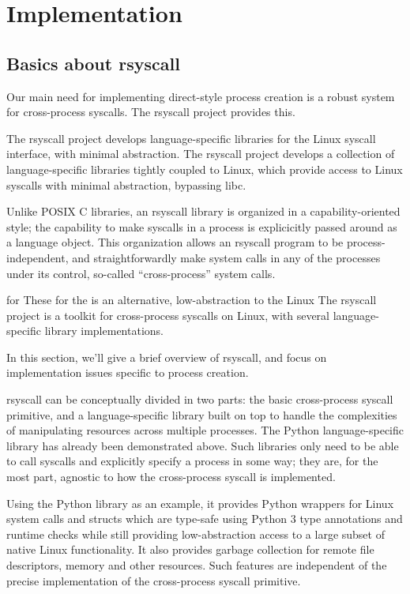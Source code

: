 \documentclass{acmart}
\begin{document}
\section{Implementation}\label{implementation}
\subsection{Basics about rsyscall}
Our main need for implementing direct-style process creation
is a robust system for cross-process syscalls.
The rsyscall project provides this.

The rsyscall project develops language-specific libraries
for the Linux syscall interface, with minimal abstraction.
The rsyscall project develops a collection of language-specific libraries tightly coupled to Linux,
which provide access to Linux syscalls with minimal abstraction,
bypassing libc.

Unlike POSIX C libraries, an rsyscall library is organized in a capability-oriented style;
the capability to make syscalls in a process is explicicitly passed around as a language object.
This organization allows an rsyscall program to be process-independent,
and straightforwardly make system calls in any of the processes under its control,
so-called ``cross-process'' system calls.

for 
These 
for the is an alternative, low-abstraction to the Linux
The rsyscall project is a toolkit for cross-process syscalls on Linux,
with several language-specific library implementations.

In this section, we'll give a brief overview of rsyscall,
and focus on implementation issues specific to process creation.

rsyscall can be conceptually divided in two parts:
the basic cross-process syscall primitive,
and a language-specific library built on top
to handle the complexities of manipulating resources across multiple processes.
The Python language-specific library has already been demonstrated above.
Such libraries only need to be able to call syscalls and explicitly specify a process in some way;
they are, for the most part, agnostic to how the cross-process syscall is implemented.

Using the Python library as an example,
it provides Python wrappers for Linux system calls and structs
which are type-safe using Python 3 type annotations and runtime checks
while still providing low-abstraction access to a large subset of native Linux functionality.
It also provides garbage collection for remote file descriptors, memory and other resources.
Such features are independent of the precise implementation of the cross-process syscall primitive.
\end{document}
